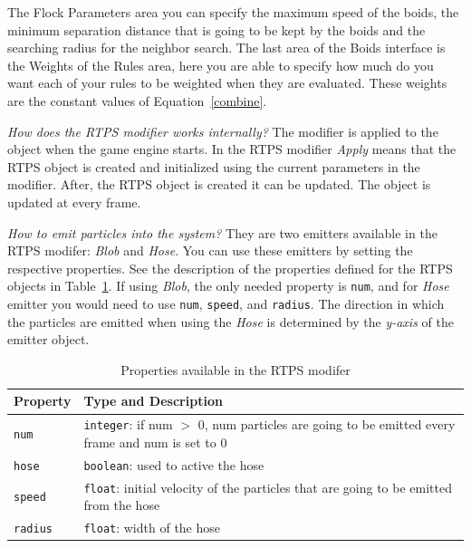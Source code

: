 The Flock Parameters area you can specify the maximum speed of the boids, the minimum separation distance that is going to be kept by the boids and the searching radius for the neighbor search. The last area of the Boids interface is the Weights of the Rules area, here you are able to specify how much do you want each of your rules to be weighted when they are evaluated. These weights are the constant values of Equation~\ref{combine}.

\textit{How does the RTPS modifier works internally?} The modifier is applied to the object when the game engine starts. In the RTPS modifier \textit{Apply} means that the RTPS object is created and initialized using the current parameters in the modifier. After, the RTPS object is created it can be updated. The object is updated at every frame.    

\textit{How to emit particles into the system?} They are two emitters available in the RTPS modifer: \textit{Blob} and \textit{Hose}. You can use these emitters by setting the respective properties. See the description of the properties defined for the RTPS objects in Table~\ref{properties}. If using \textit{Blob}, the only needed property is \texttt{num}, and for \textit{Hose} emitter you would need to use \texttt{num}, \texttt{speed}, and \texttt{radius}. The direction in which the particles are emitted when using the \textit{Hose} is determined by the \textit{y-axis} of the emitter object. 

\begin{table}[htdp]
\caption{Properties available in the RTPS modifer}
\begin{center}
\begin{tabular}{|p{3cm}|p{9cm}|}
\hline 
\textbf{Property} & \textbf{Type and Description} \\\hline 
\texttt{num} 	& \texttt{integer}: if num $>$ 0, num particles are going to be emitted every frame and num is set to 0	\\\hline 
\texttt{hose}	& \texttt{boolean}: used to active the hose	\\\hline
\texttt{speed}	& \texttt{float}: initial velocity of the particles that are going to be emitted from the hose	\\\hline
\texttt{radius}	& \texttt{float}: width of the hose	\\ %
\hline 
\end{tabular}
\end{center}
\label{properties}
\end{table}

